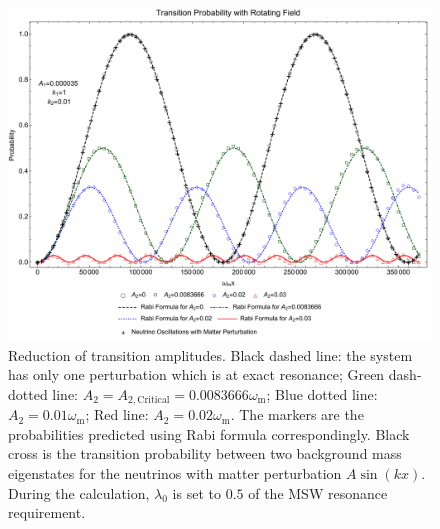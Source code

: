 \documentclass[%
reprint,
 amsmath,amssymb,
 aps,
]{revtex4-1}
\begin{document}


\begin{figure}[!htbp]
                \centering
                \includegraphics[width=\columnwidth]{assets/rabi-oscillations-energy-gap-change-k2-0-01}
                \caption{Reduction of transition amplitudes. Black dashed line: the system has only one perturbation which is at exact resonance; Green dash-dotted line: $A_2=A_{2,\mathrm{Critical}}=0.0083666\omega_{\mathrm m}$; Blue dotted line: $A_2=0.01\omega_{\mathrm m}$; Red line: $A_2=0.02\omega_{\mathrm m}$. The markers are the probabilities predicted using Rabi formula correspondingly. Black cross is the transition probability between two background mass eigenstates for the neutrinos with matter perturbation $A\sin(kx)$. During the calculation, $\lambda_0$ is set to $0.5$ of the MSW resonance requirement.}
                \label{fig-rabi-oscillations-energy-gap-change}
\end{figure}
\end{document}
